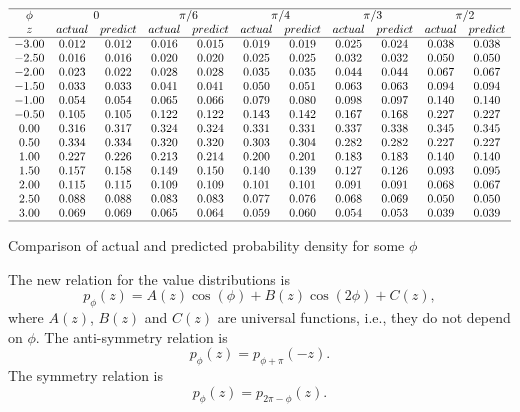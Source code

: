 \documentclass[twoside]{article}
\begin{document}
\begin{table}
\centering \(\begin{array}{ccccccccccc}

\hline
\phi  &  \multicolumn{2}{c}  {0 }   &    \multicolumn{2}{c}  {\pi/6}&  \multicolumn{2}{c}  { \pi/4}   &    \multicolumn{2}{c}  {\pi/3}&  \multicolumn{2}{c}  {\pi/2 } \\
z&actual&predict&actual&predict &actual&predict &actual&predict &actual&predict\\
\hline
  -3.00&  0.012&  0.012&  0.016&  0.015&  0.019&  0.019&  0.025&  0.024&  0.038&  0.038 \\
  -2.50&  0.016&  0.016&  0.020&  0.020&  0.025&  0.025&  0.032&  0.032&  0.050&  0.050 \\
  -2.00&  0.023&  0.022&  0.028&  0.028&  0.035&  0.035&  0.044&  0.044&  0.067&  0.067 \\
  -1.50&  0.033&  0.033&  0.041&  0.041&  0.050&  0.051&  0.063&  0.063&  0.094&  0.094 \\
  -1.00&  0.054&  0.054&  0.065&  0.066&  0.079&  0.080&  0.098&  0.097&  0.140&  0.140 \\
  -0.50&  0.105&  0.105&  0.122&  0.122&  0.143&  0.142&  0.167&  0.168&  0.227&  0.227 \\
   0.00&  0.316&  0.317&  0.324&  0.324&  0.331&  0.331&  0.337&  0.338&  0.345&  0.345 \\
   0.50&  0.334&  0.334&  0.320&  0.320&  0.303&  0.304&  0.282&  0.282&  0.227&  0.227 \\
   1.00&  0.227&  0.226&  0.213&  0.214&  0.200&  0.201&  0.183&  0.183&  0.140&  0.140 \\
   1.50&  0.157&  0.158&  0.149&  0.150&  0.140&  0.139&  0.127&  0.126&  0.093&  0.095 \\
   2.00&  0.115&  0.115&  0.109&  0.109&  0.101&  0.101&  0.091&  0.091&  0.068&  0.067 \\
   2.50&  0.088&  0.088&  0.083&  0.083&  0.077&  0.076&  0.068&  0.069&  0.050&  0.050 \\
   3.00&  0.069&  0.069&  0.065&  0.064&  0.059&  0.060&  0.054&  0.053&  0.039&  0.039 \\
\hline
\end{array}\)
\caption{Comparison of actual and predicted probability density for some $\phi$   }
\label{tab:pred}
\end{table}



The new  relation for the value distributions is
\begin{equation}
p_{\phi}(z) = A(z)\cos(\phi) + B(z)\cos(2\phi) +C(z),
\label{eq:universality}
\end{equation}
where $A(z)$, $B(z)$ and $C(z)$ are universal functions, i.e., they do not depend on $\phi$. 
The anti-symmetry relation is
\begin{equation}
p_{\phi}(z) = p_{\phi+\pi}(-z).
\label{eq:rhoantisym}
\end{equation}
The symmetry relation is
\begin{equation}
p_{\phi}(z) = p_{2\pi-\phi}(z).
\label{eq:rhosym}
\end{equation}
\end{document}
